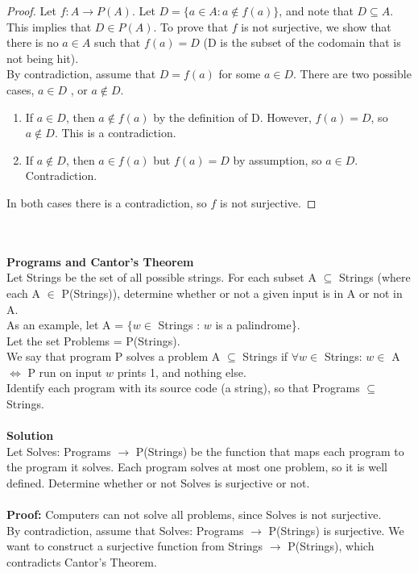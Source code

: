 \documentclass{article}
\begin{document}
\begin{proof}
 Let $f: A \rightarrow P(A)$. Let $D = \{a \in A: a \not\in f(a)\}$, and note that $D \subseteq A$. This implies that $D \in P(A)$. To prove that $f$ is not surjective, we show that there is no $a \in A$ such that $f(a) = D$ (D is the subset of the codomain that is not being hit).\\
By contradiction, assume that $D = f(a)$ for some $a \in D$. There are two possible cases, $a \in D$
, or $a \not\in D$.\\
\begin{enumerate}
    \item If $a \in D$, then $a \not\in f(a)$ by the definition of D. However, $f(a) = D$, so $a \not\in D$. This is a contradiction.
    \item If $a \not\in D$, then $a \in f(a)$ but $f(a) = D$ by assumption, so $a \in D$. Contradiction.
\end{enumerate}
In both cases there is a contradiction, so $f$ is not surjective.
\end{proof}
\\
\\
\textbf{Programs and Cantor's Theorem}\\
Let Strings be the set of all possible strings. For each subset A $\subseteq$ Strings (where each A $\in$ P(Strings)), determine whether or not a given input is in A or not in A.\\
As an example, let A = $\{ w \in $ Strings : $w$ is a palindrome\}.\\
Let the set Problems = P(Strings).\\
We say that program P solves a problem A $\subseteq$ Strings if $\forall w \in $ Strings:
$w \in$ A $\iff$ P run on input $w$ prints 1, and nothing else.\\
Identify each program with its source code (a string), so that Programs $\subseteq$ Strings.\\
\\
\textbf{Solution}\\
Let Solves: Programs $\rightarrow$ P(Strings) be the function that maps each program to the program it solves. Each program solves at most one problem, so it is well defined. Determine whether or not Solves is surjective or not.\\
\\
\textbf{Proof: }Computers can not solve all problems, since Solves is not surjective.\\
By contradiction, assume that Solves: Programs $\rightarrow$ P(Strings) is surjective. We want to construct a surjective function from Strings $\rightarrow$ P(Strings), which contradicts Cantor's Theorem.\\
\end{document}
